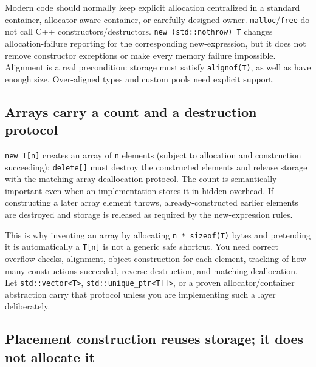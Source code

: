 Modern code should normally keep explicit allocation centralized in a standard container, allocator-aware container, or carefully designed owner. \texttt{malloc}/\texttt{free} do not call C++ constructors/destructors. \texttt{new\ (std::nothrow)\ T} changes allocation-failure reporting for the corresponding new-expression, but it does not remove constructor exceptions or make every memory failure impossible. Alignment is a real precondition: storage must satisfy \texttt{alignof(T)}, as well as have enough size. Over-aligned types and custom pools need explicit support.

\subsection{Arrays carry a count and a destruction protocol}\label{05-engine-i-ch004-arrays-carry-a-count-and-a-destruction-protocol}

\hypertarget{05-engine-i-ch004-arrays-carry-a-count-and-a-destruction-protocol}{}

\texttt{new\ T{[}n{]}} creates an array of \texttt{n} elements (subject to allocation and construction succeeding); \texttt{delete{[}{]}} must destroy the constructed elements and release storage with the matching array deallocation protocol. The count is semantically important even when an implementation stores it in hidden overhead. If constructing a later array element throws, already-constructed earlier elements are destroyed and storage is released as required by the new-expression rules.

This is why inventing an array by allocating \texttt{n\ *\ sizeof(T)} bytes and pretending it is automatically a \texttt{T{[}n{]}} is not a generic safe shortcut. You need correct overflow checks, alignment, object construction for each element, tracking of how many constructions succeeded, reverse destruction, and matching deallocation. Let \texttt{std::vector\textless{}T\textgreater{}}, \texttt{std::unique\_ptr\textless{}T{[}{]}\textgreater{}}, or a proven allocator/container abstraction carry that protocol unless you are implementing such a layer deliberately.

\subsection{Placement construction reuses storage; it does not allocate it}\label{05-engine-i-ch004-placement-construction-reuses-storage-it-does-not-allocate-it}

\hypertarget{05-engine-i-ch004-placement-construction-reuses-storage-it-does-not-allocate-it}{}

